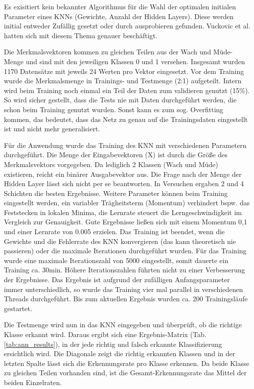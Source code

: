 Es exisitiert kein bekannter Algorithmus für die Wahl der optimalen initialen Parameter eines KNNs (Gewichte, Anzahl der Hidden Layers). Diese werden initial entweder Zufällig gesetzt oder durch ausprobieren gefunden. Vuckovic et al. \cite{Vuckovic2002349} hatten sich mit diesem Thema genauer beschäftigt.

Die Merkmalsvektoren kommen zu gleichen Teilen aus der Wach und Müde-Menge und sind mit den jeweiligen Klassen 0 und 1 versehen. Insgesamt wurden 1170 Datensätze mit jeweils 24 Werten pro Vektor eingesetzt. Vor dem Training wurde die Merkmalsmenge in Trainings- und Testmenge (2:1) aufgeteilt. Intern wird beim Training noch einmal ein Teil der Daten zum validieren genutzt (15\%). So wird sicher gestellt, dass die Tests nie mit Daten durchgeführt werden, die schon beim Training genutzt wurden. Sonst kann es zum sog. Overfitting kommen, das bedeutet, dass das Netz zu genau auf die Trainingsdaten eingestellt ist und nicht mehr generalisiert.

Für die Anwendung wurde das Training des KNN mit verschiedenen Parametern durchgeführt. Die Menge der Eingabevektoren (X) ist durch die Größe des Merkmalsvektors vorgegeben. Da lediglich 2 Klassen (Wach und Müde) existieren, reicht ein binärer Ausgabevektor aus. Die Frage nach der Menge der Hidden Layer lässt sich nicht per se beantworten. In Versuchen ergaben 2 und 4 Schichten die besten Ergebnisse. Weitere Parameter können beim Training eingestellt werden, ein variabler Trägheitsterm (Momentum) verhindert bspw. das Feststecken in lokalen Minima, die Lernrate steuert die Lerngeschwindigkeit im Vergleich zur Genauigkeit. Gute Ergebnisse ließen sich mit einem Momentum 0,1 und einer Lernrate von 0.005 erzielen. Das Training ist beendet, wenn die Gewichte und die Fehlerrate des KNN konvergieren (das kann theoretisch nie passieren) oder die maximale Iterationen durchgeführt wurden. Für das Training wurde eine maximale Iterationszahl von 5000 eingestellt, somit dauerte ein Training ca. 30min. Höhere Iterationszahlen führten nicht zu einer Verbesserung der Ergebnisse. Das Ergebnis ist aufgrund der zufälligen Anfangsparameter immer unterschiedlich, so wurde das Training vier mal parallel in verschiedenen Threads durchgeführt. Bis zum aktuellen Ergebnis wurden ca. 200 Trainingsläufe gestartet.

Die Testmenge wird nun in das KNN eingegeben und überprüft, ob die richtige Klasse erkannt wird. Daraus ergibt sich eine Ergebnis-Matrix (Tab. \ref{tab:ann_results}), in der jede richtig und falsch erkannte Klassifizierung ersichtlich wird. Die Diagonale zeigt die richtig erkannten Klassen und in der letzten Spalte lässt sich die Erkennungsrate pro Klasse erkennen. Da beide Klasse zu gleichen Teilen vorhanden sind, ist die  Gesamt-Erkennungsrate das Mittel der beiden Einzelraten.

